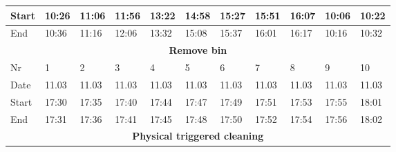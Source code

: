 \begin{table}[H]
\begin{tabular}{|lllllllllll|}
\multicolumn{1}{|l|}{Start}  & \multicolumn{1}{l|}{10:26} & \multicolumn{1}{l|}{11:06} & \multicolumn{1}{l|}{11:56} & \multicolumn{1}{l|}{13:22} & \multicolumn{1}{l|}{14:58} & \multicolumn{1}{l|}{15:27} & \multicolumn{1}{l|}{15:51} & \multicolumn{1}{l|}{16:07} & \multicolumn{1}{l|}{10:06} & 10:22 \\ \hline
\multicolumn{1}{|l|}{End}    & \multicolumn{1}{l|}{10:36} & \multicolumn{1}{l|}{11:16} & \multicolumn{1}{l|}{12:06} & \multicolumn{1}{l|}{13:32} & \multicolumn{1}{l|}{15:08} & \multicolumn{1}{l|}{15:37} & \multicolumn{1}{l|}{16:01} & \multicolumn{1}{l|}{16:17} & \multicolumn{1}{l|}{10:16} & 10:32 \\ \hline
\multicolumn{11}{|c|}{\textbf{Remove bin}}                                                                                                                                                                                                                                                                \\ \hline
\multicolumn{1}{|l|}{Nr} & \multicolumn{1}{l|}{1}     & \multicolumn{1}{l|}{2}     & \multicolumn{1}{l|}{3}     & \multicolumn{1}{l|}{4}     & \multicolumn{1}{l|}{5}     & \multicolumn{1}{l|}{6}     & \multicolumn{1}{l|}{7}     & \multicolumn{1}{l|}{8}     & \multicolumn{1}{l|}{9}     & 10    \\ \hline
\multicolumn{1}{|l|}{Date}   & \multicolumn{1}{l|}{11.03} & \multicolumn{1}{l|}{11.03} & \multicolumn{1}{l|}{11.03} & \multicolumn{1}{l|}{11.03} & \multicolumn{1}{l|}{11.03} & \multicolumn{1}{l|}{11.03} & \multicolumn{1}{l|}{11.03} & \multicolumn{1}{l|}{11.03} & \multicolumn{1}{l|}{11.03} & 11.03 \\ \hline
\multicolumn{1}{|l|}{Start}  & \multicolumn{1}{l|}{17:30} & \multicolumn{1}{l|}{17:35} & \multicolumn{1}{l|}{17:40} & \multicolumn{1}{l|}{17:44} & \multicolumn{1}{l|}{17:47} & \multicolumn{1}{l|}{17:49} & \multicolumn{1}{l|}{17:51} & \multicolumn{1}{l|}{17:53} & \multicolumn{1}{l|}{17:55} & 18:01 \\ \hline
\multicolumn{1}{|l|}{End}    & \multicolumn{1}{l|}{17:31} & \multicolumn{1}{l|}{17:36} & \multicolumn{1}{l|}{17:41} & \multicolumn{1}{l|}{17:45} & \multicolumn{1}{l|}{17:48} & \multicolumn{1}{l|}{17:50} & \multicolumn{1}{l|}{17:52} & \multicolumn{1}{l|}{17:54} & \multicolumn{1}{l|}{17:56} & 18:02 \\ \hline
\multicolumn{11}{|c|}{\textbf{Physical triggered cleaning}}                                                                                                                                                                                                                                               \\ \hline

\end{tabular}
\end{table}
